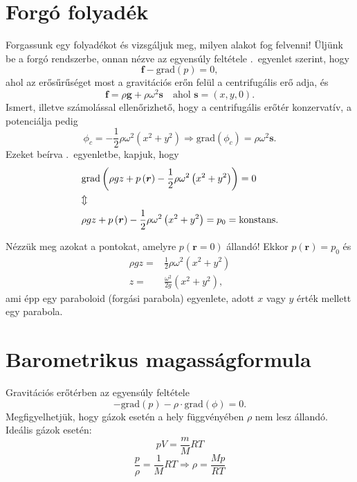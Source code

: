\documentclass[12pt,a4paper]{scrartcl}
\let\mathbf\bm
\begin{document}
\section{Forgó folyadék}
Forgassunk egy folyadékot és vizsgáljuk meg, milyen alakot fog felvenni! Üljünk be a forgó rendszerbe, onnan nézve az egyensúly feltétele .\ egyenlet szerint, hogy
\begin{equation} \label{eq:forgo_foly_alapegyenlet}
{\mathbf{f}} - {\text{grad}}\left( p \right) = 0,
\end{equation}
ahol az erősűrűséget most a gravitációs erőn felül a centrifugális erő adja, és
\[{\mathbf{f}} = \rho {\mathbf{g}} + \rho \omega^2 {\mathbf{s}}\quad\text{ahol } {\mathbf{s}} = \left( {x,y,0} \right).\]
Ismert, illetve számolással ellenőrizhető, hogy a centrifugális erőtér konzervatív, a potenciálja pedig
\[{\phi _c} =  - \frac{1}{2}\rho {\omega ^2}\left( {{x^2} + {y^2}} \right) \Rightarrow {\text{grad}}\left( {{\phi _c}} \right) = \rho \omega^2 {\mathbf{s}}.\]
Ezeket beírva .\ egyenletbe, kapjuk, hogy
\begin{gather*}
  {\text{grad}}\left( \rho gz + {p\left( {\mathbf{r}} \right) - \frac{1}{2}\rho {\omega ^2}\left( {{x^2} + {y^2}} \right)} \right) = 0 \hfill \\
   \Updownarrow  \hfill \\
  \rho gz  + p\left( {\mathbf{r}} \right) - \frac{1}{2}\rho {\omega ^2}\left( {{x^2} + {y^2}} \right) = {p_0} = \text{konstans.} \hfill \\ 
\end{gather*}

Nézzük meg azokat a pontokat, amelyre $p\left( {{\mathbf{r}} = 0} \right)$ állandó! Ekkor $p\left( {\mathbf{r}} \right) = {p_0}$ és 
\begin{align}
  \rho gz =  & \frac{1}{2}\rho {\omega ^2}\left( {{x^2} + {y^2}} \right) \nonumber \\ 
  z =  & \frac{{{\omega ^2}}}{{2g}}\left( {{x^2} + {y^2}} \right),
\end{align} 
ami épp egy paraboloid (forgási parabola) egyenlete, adott $x$ vagy $y$ érték mellett egy parabola.

\section{Barometrikus magasságformula}
Gravitációs erőtérben az egyensúly feltétele \[ - {\text{grad}}\left( p \right) - \rho  \cdot {\text{grad}}\left( \phi  \right) = 0.\]
Megfigyelhetjük, hogy gázok esetén a hely függvényében $\rho$ nem lesz állandó. Ideális gázok esetén:
\[pV = \frac{m}{M}RT\]
\begin{equation} \label{eq:rho_p_prop}
\frac{p}{\rho } = \frac{1}{M}RT \Rightarrow \rho  = \frac{{Mp}}{{RT}}
\end{equation}
\end{document}
